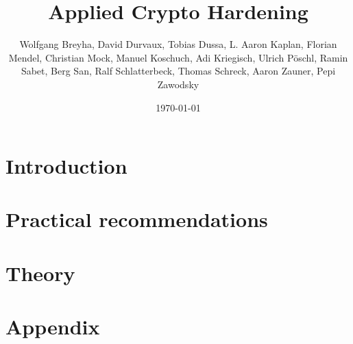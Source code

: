 \documentclass[	DIV=calc,%
				paper=a4,%
				fontsize=9pt,%
				onecolumn]{scrreprt}	 					%
\title{Applied Crypto Hardening}%
\author{Wolfgang Breyha, David Durvaux, Tobias Dussa, L. Aaron
					Kaplan, Florian Mendel, Christian Mock, Manuel Koschuch, Adi
					Kriegisch, Ulrich Pöschl, Ramin Sabet, Berg San, Ralf Schlatterbeck, 
					Thomas Schreck, Aaron Zauner, Pepi Zawodsky}
\date{\today}
\newcommand{\initial}[1]{%
     \lettrine[lines=3,lhang=0.3,nindent=0em]{
     				\color{darkblue}
     				{\textsf{#1}}}{}}
\begin{document}
\maketitle

\thispagestyle{fancy} 			%





\tableofcontents
\chapter{Introduction}
\label{chapter:Intro}






\chapter{Practical recommendations}
\label{chapter:PracticalSettings}

\chapter{Theory}
\label{chapter:Theory}

\chapter{Appendix}





%

\end{document}
